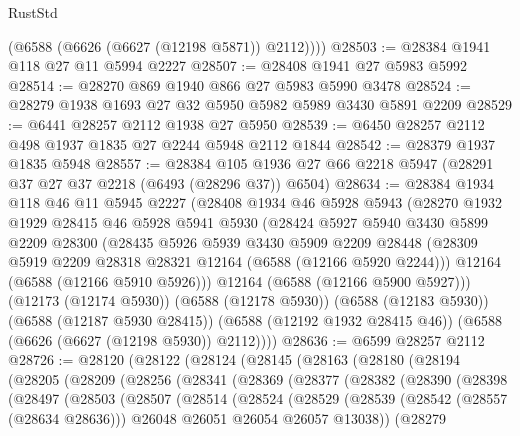 \begin{lexlean}{RustStd}
\begin{coremodule}
        (@6588 (@6626 (@6627 (@12198 @5871)) @2112))))
@28503 := @28384 @1941 @118 @27 @11 @5994 @2227
@28507 := @28408 @1941 @27 @5983 @5992
@28514 := @28270 @869 @1940 @866 @27 @5983 @5990 @3478
@28524 := @28279 @1938 @1693 @27 @32 @5950 @5982 @5989 @3430 @5891 @2209
@28529 := @6441 @28257 @2112 @1938 @27 @5950
@28539 := @6450 @28257 @2112 @498 @1937 @1835 @27 @2244 @5948 @2112 @1844
@28542 := @28379 @1937 @1835 @5948
@28557 := @28384
    @105
    @1936
    @27
    @66
    @2218
    @5947
    (@28291 @37 @27 @37 @2218 (@6493 (@28296 @37)) @6504)
@28634 := @28384
    @1934
    @118
    @46
    @11
    @5945
    @2227
    (@28408
      @1934
      @46
      @5928
      @5943
      (@28270
        @1932
        @1929
        @28415
        @46
        @5928
        @5941
        @5930
        (@28424
          @5927
          @5940
          @3430
          @5899
          @2209
          @28300
          (@28435
            @5926
            @5939
            @3430
            @5909
            @2209
            @28448
            (@28309 @5919 @2209 @28318 @28321 @12164 (@6588 (@12166 @5920 @2244)))
            @12164
            (@6588 (@12166 @5910 @5926)))
          @12164
          (@6588 (@12166 @5900 @5927)))
        (@12173 (@12174 @5930))
        (@6588 (@12178 @5930))
        (@6588 (@12183 @5930))
        (@6588 (@12187 @5930 @28415))
        (@6588 (@12192 @1932 @28415 @46))
        (@6588 (@6626 (@6627 (@12198 @5930)) @2112))))
@28636 := @6599 @28257 @2112
@28726 := @28120
    (@28122
      (@28124
        (@28145
          (@28163
            (@28180
              (@28194
                (@28205
                  (@28209
                    (@28256
                      (@28341
                        (@28369
                          (@28377
                            (@28382
                              (@28390
                                (@28398
                                  (@28497
                                    (@28503
                                      (@28507
                                        (@28514
                                          (@28524
                                            (@28529
                                              (@28539
                                                (@28542 (@28557 (@28634 @28636)))
                                                @26048
                                                @26051
                                                @26054
                                                @26057
                                                @13038))
                                            (@28279

\end{coremodule}
\end{lexlean}
